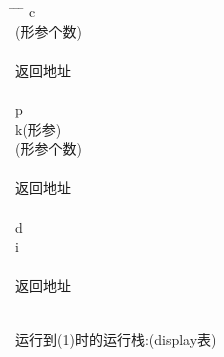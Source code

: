\documentclass{article}
\begin{document}
\begin{tabbing}
    \hspace{1.5cm} \= \hspace{1.5cm} \= \hspace{1.5cm} \= \kill
     \> c\\

     (形参个数)\\

     \\

     \> 返回地址\\

     \\

     \> p\\

     \> k(形参)\\

     (形参个数)\\

     \\

     \> 返回地址\\

     \\

     \> d \\

     \> i\\

     \\

     \> 返回地址\\

     \\

\end{tabbing}

运行到(1)时的运行栈:(display表)
\end{document}
